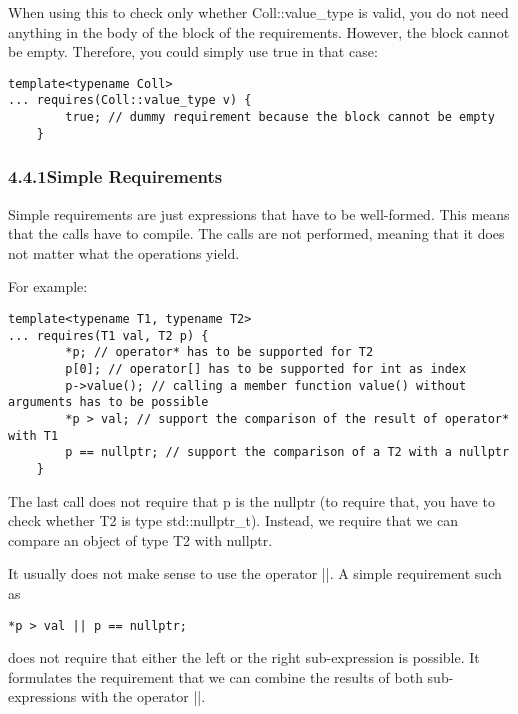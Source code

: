 When using this to check only whether Coll::value\_type is valid, you do not need anything in the body of the block of the requirements. However, the block cannot be empty. Therefore, you could simply use true in that case:

\begin{lstlisting}[style=styleCXX]
template<typename Coll>
... requires(Coll::value_type v) {
		true; // dummy requirement because the block cannot be empty
	}
\end{lstlisting}

\subsubsection*{ 4.4.1\hspace{0.2cm}Simple Requirements}

Simple requirements are just expressions that have to be well-formed. This means that the calls have to compile. The calls are not performed, meaning that it does not matter what the operations yield.

For example:

\begin{lstlisting}[style=styleCXX]
template<typename T1, typename T2>
... requires(T1 val, T2 p) {
		*p; // operator* has to be supported for T2
		p[0]; // operator[] has to be supported for int as index
		p->value(); // calling a member function value() without arguments has to be possible
		*p > val; // support the comparison of the result of operator* with T1
		p == nullptr; // support the comparison of a T2 with a nullptr
	}
\end{lstlisting}

The last call does not require that p is the nullptr (to require that, you have to check whether T2 is type std::nullptr\_t). Instead, we require that we can compare an object of type T2 with nullptr.

It usually does not make sense to use the operator ||. A simple requirement such as

\begin{lstlisting}[style=styleCXX]
*p > val || p == nullptr;
\end{lstlisting}

does not require that either the left or the right sub-expression is possible. It formulates the requirement that we can combine the results of both sub-expressions with the operator ||.


